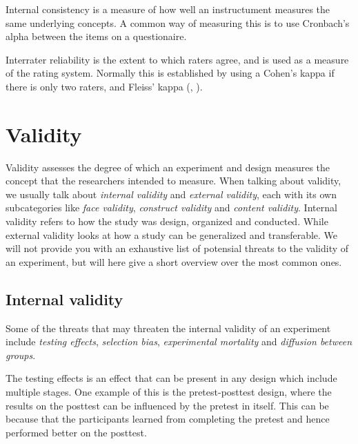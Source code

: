 	\bigskip\noindent
	Internal consistency is a measure of how well an instructument measures the same underlying concepts. A common way of measuring this is to use Cronbach's alpha between the items on a questionaire.
	
	\bigskip\noindent
	Interrater reliability is the extent to which raters agree, and is used as a measure of the rating system. Normally this is established by using a Cohen's kappa if there is only two raters, and Fleiss' kappa (\cite{gwet2001handbook}, \cite{shrout1979intraclass}).
	
\section{Validity}
	Validity assesses the degree of which an experiment and design measures the concept that the researchers intended to measure.
	When talking about validity, we usually talk about \textit{internal validity} and \textit{external validity}, each with its own subcategories like \textit{face validity}, \textit{construct validity} and \textit{content validity}.
	Internal validity refers to how the study was design, organized and conducted. While external validity looks at how a study can be generalized and transferable.
	We will not provide you with an exhaustive list of potensial threats to the validity of an experiment, but will here give a short overview over the most common ones.
	
	\subsection{Internal validity}
	Some of the threats that may threaten the internal validity of an experiment include \textit{testing effects}, \textit{selection bias}, \textit{experimental mortality} and \textit{diffusion between groups}.
	
	\bigskip\noindent
	The testing effects is an effect that can be present in any design which include multiple stages. 
	One example of this is the pretest-posttest design, where the results on the posttest can be influenced by the pretest in itself. 
	This can be because that the participants learned from completing the pretest and hence performed better on the posttest.
	
